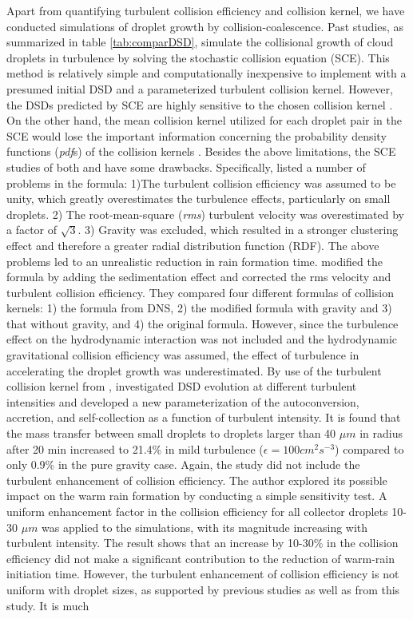 Apart from quantifying turbulent collision efficiency and collision kernel, we have conducted simulations of droplet growth by collision-coalescence. Past studies, as summarized in table \ref{tab:comparDSD}, simulate the collisional growth of cloud droplets in turbulence by solving the stochastic collision equation (SCE). This method is relatively simple and computationally inexpensive to implement with a presumed initial DSD and a parameterized turbulent collision kernel. However, the DSDs predicted by SCE are highly sensitive to the chosen collision kernel \citep{Xue2008}. On the other hand, the mean collision kernel utilized for each droplet pair in the SCE would lose the important information concerning the probability density functions (\emph{pdf}s) of the collision kernels \citep{Pinsky2008}.  Besides the above limitations, the SCE studies of both \citet{Riemer2005} and \citet{Xue2008} have some drawbacks. Specifically, \citet{Xue2008} listed a number of problems in the \citet{Riemer2005} formula: 1)The turbulent collision efficiency was assumed to be unity, which greatly overestimates the turbulence effects, particularly on small droplets. 2) The root-mean-square (\emph{rms}) turbulent velocity was overestimated by a factor of $\sqrt{3}$. 3) Gravity was excluded, which resulted in a stronger clustering effect and therefore a greater radial distribution function (RDF). The above problems led to an unrealistic reduction in rain formation time. \citet{Xue2008} modified the \citet{Riemer2005} formula by adding the sedimentation effect and corrected the rms velocity and turbulent collision efficiency. They compared four different formulas of collision kernels: 1) the \citet{Ayala2008b} formula from DNS, 2) the modified \citet{Xue2008} formula with gravity and 3) that without gravity, and 4) the original \citet{Xue2008} formula.  However, since the turbulence effect on the hydrodynamic interaction was not included and the \citet{Hall1980} hydrodynamic gravitational collision efficiency was assumed, the effect of turbulence in accelerating the droplet growth was underestimated. By use of the turbulent collision kernel from \citet{Franklin2007}, \citet{Franklin2008} investigated DSD evolution at different turbulent intensities and developed a new parameterization of the autoconversion, accretion, and self-collection as a function of turbulent intensity. It is found that the mass transfer between small droplets to droplets larger than 40 $\mu m$ in radius after 20 min increased to 21.4\% in mild turbulence ($\epsilon=100cm^2s^{-3}$) compared to only 0.9\% in the pure gravity case. Again, the study did not include the turbulent enhancement of collision efficiency. The author explored its possible impact on the warm rain formation by conducting a simple sensitivity test. A uniform enhancement factor in the collision efficiency for all collector droplets 10-30 $\mu m$ was applied to the simulations, with its magnitude increasing with turbulent intensity. The result shows that an increase by 10-30\% in the collision efficiency did not make a significant contribution to the reduction of warm-rain initiation time. However, the turbulent enhancement of collision efficiency is not uniform with droplet sizes, as supported by previous studies as well as from this study. It is much 